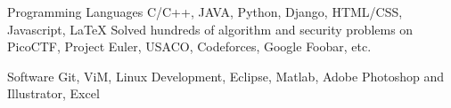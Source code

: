 

\begin{cvskills}

  \cvskill
    {Programming Languages} %
    {C/C++, JAVA, Python, Django, HTML/CSS, Javascript, LaTeX \newline
    Solved hundreds of algorithm and security problems on PicoCTF, Project Euler, USACO, Codeforces, Google Foobar, etc.} %

 \cvskill
    {Software} %
    {Git, ViM, Linux Development, Eclipse, Matlab, Adobe Photoshop and Illustrator, Excel} %

%
%
%
%



\end{cvskills}
